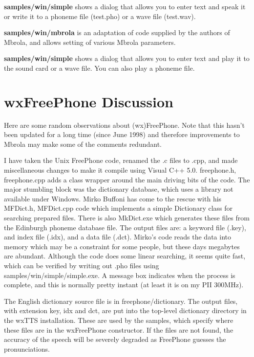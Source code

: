 
{\bf samples/win/simple} shows a dialog that allows you to enter text
and speak it or write it to a phoneme file (test.pho) or a wave file (test.wav).

{\bf samples/win/mbrola} is an adaptation of code supplied by the authors of Mbrola,
and allows setting of various Mbrola parameters.


{\bf samples/win/simple} shows a dialog that allows you to enter text
and play it to the sound card or a wave file. You can also play a phoneme file.

\chapter{wxFreePhone Discussion}\label{freephone}
%
\setfooter{\thepage}{}{}{}{}{\thepage}%

Here are some random observations about (wx)FreePhone. Note that this hasn't been updated
for a long time (since June 1998) and therefore improvements to Mbrola may make some of the comments
redundant.


I have taken the Unix FreePhone code, renamed the .c files to .cpp, and made miscellaneous
changes to make it compile using Visual C++ 5.0. freephone.h, freephone.cpp adds a class
wrapper around the main driving bits of the code. The major stumbling block
was the dictionary database, which uses a library not available under Windows.
Mirko Buffoni has come to the rescue with his MFDict.h, MFDict.cpp code which
implements a simple Dictionary class for searching prepared files. There is also
MkDict.exe which generates these files from the Edinburgh phoneme database file. The output
files are: a keyword file (.key), and index file (.idx), and a data file (.dct).
Mirko's code reads the data into memory which may be a constraint for some people, but
these days megabytes are abundant. Although the code does some linear searching, it seems quite fast,
which can be verified by writing out .pho files using samples/win/simple/simple.exe.
A message box indicates when the process is complete, and this is normally pretty instant
(at least it is on my PII 300MHz).


The English dictionary source file is in freephone/dictionary. The output files,
with extension key, idx and dct, are put into the top-level dictionary directory
in the wxTTS installation. These are used by the samples, which specify where these
files are in the wxFreePhone constructor. If the files are not found, the accuracy
of the speech will be severely degraded as FreePhone guesses the pronunciations.

